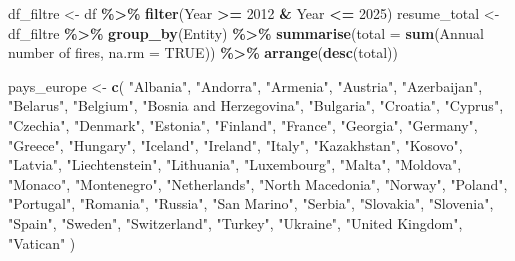 \documentclass[
]{article}
\newenvironment{Shaded}{\begin{snugshade}}{\end{snugshade}}
\newcommand{\AttributeTok}[1]{\textcolor[rgb]{0.13,0.29,0.53}{#1}}
\newcommand{\ConstantTok}[1]{\textcolor[rgb]{0.56,0.35,0.01}{#1}}
\newcommand{\DecValTok}[1]{\textcolor[rgb]{0.00,0.00,0.81}{#1}}
\newcommand{\FunctionTok}[1]{\textcolor[rgb]{0.13,0.29,0.53}{\textbf{#1}}}
\newcommand{\NormalTok}[1]{#1}
\newcommand{\OtherTok}[1]{\textcolor[rgb]{0.56,0.35,0.01}{#1}}
\newcommand{\SpecialCharTok}[1]{\textcolor[rgb]{0.81,0.36,0.00}{\textbf{#1}}}
\newcommand{\StringTok}[1]{\textcolor[rgb]{0.31,0.60,0.02}{#1}}
\begin{document}
\begin{Shaded}
\begin{Highlighting}[]
\NormalTok{df\_filtre }\OtherTok{\textless{}{-}}\NormalTok{ df }\SpecialCharTok{\%\textgreater{}\%} \FunctionTok{filter}\NormalTok{(Year }\SpecialCharTok{\textgreater{}=} \DecValTok{2012} \SpecialCharTok{\&}\NormalTok{ Year }\SpecialCharTok{\textless{}=} \DecValTok{2025}\NormalTok{)}
\NormalTok{resume\_total }\OtherTok{\textless{}{-}}\NormalTok{ df\_filtre }\SpecialCharTok{\%\textgreater{}\%}
  \FunctionTok{group\_by}\NormalTok{(Entity) }\SpecialCharTok{\%\textgreater{}\%}
  \FunctionTok{summarise}\NormalTok{(}\AttributeTok{total =} \FunctionTok{sum}\NormalTok{(}\StringTok{\textasciigrave{}}\AttributeTok{Annual number of fires}\StringTok{\textasciigrave{}}\NormalTok{, }\AttributeTok{na.rm =} \ConstantTok{TRUE}\NormalTok{)) }\SpecialCharTok{\%\textgreater{}\%}
  \FunctionTok{arrange}\NormalTok{(}\FunctionTok{desc}\NormalTok{(total))}

\NormalTok{pays\_europe }\OtherTok{\textless{}{-}} \FunctionTok{c}\NormalTok{(}
  \StringTok{"Albania"}\NormalTok{, }\StringTok{"Andorra"}\NormalTok{, }\StringTok{"Armenia"}\NormalTok{, }\StringTok{"Austria"}\NormalTok{, }\StringTok{"Azerbaijan"}\NormalTok{, }\StringTok{"Belarus"}\NormalTok{, }\StringTok{"Belgium"}\NormalTok{, }\StringTok{"Bosnia and Herzegovina"}\NormalTok{,}
  \StringTok{"Bulgaria"}\NormalTok{, }\StringTok{"Croatia"}\NormalTok{, }\StringTok{"Cyprus"}\NormalTok{, }\StringTok{"Czechia"}\NormalTok{, }\StringTok{"Denmark"}\NormalTok{, }\StringTok{"Estonia"}\NormalTok{, }\StringTok{"Finland"}\NormalTok{, }\StringTok{"France"}\NormalTok{, }\StringTok{"Georgia"}\NormalTok{,}
  \StringTok{"Germany"}\NormalTok{, }\StringTok{"Greece"}\NormalTok{, }\StringTok{"Hungary"}\NormalTok{, }\StringTok{"Iceland"}\NormalTok{, }\StringTok{"Ireland"}\NormalTok{, }\StringTok{"Italy"}\NormalTok{, }\StringTok{"Kazakhstan"}\NormalTok{, }\StringTok{"Kosovo"}\NormalTok{, }\StringTok{"Latvia"}\NormalTok{, }\StringTok{"Liechtenstein"}\NormalTok{,}
  \StringTok{"Lithuania"}\NormalTok{, }\StringTok{"Luxembourg"}\NormalTok{, }\StringTok{"Malta"}\NormalTok{, }\StringTok{"Moldova"}\NormalTok{, }\StringTok{"Monaco"}\NormalTok{, }\StringTok{"Montenegro"}\NormalTok{, }\StringTok{"Netherlands"}\NormalTok{, }\StringTok{"North Macedonia"}\NormalTok{,}
  \StringTok{"Norway"}\NormalTok{, }\StringTok{"Poland"}\NormalTok{, }\StringTok{"Portugal"}\NormalTok{, }\StringTok{"Romania"}\NormalTok{, }\StringTok{"Russia"}\NormalTok{, }\StringTok{"San Marino"}\NormalTok{, }\StringTok{"Serbia"}\NormalTok{, }\StringTok{"Slovakia"}\NormalTok{, }\StringTok{"Slovenia"}\NormalTok{, }\StringTok{"Spain"}\NormalTok{,}
  \StringTok{"Sweden"}\NormalTok{, }\StringTok{"Switzerland"}\NormalTok{, }\StringTok{"Turkey"}\NormalTok{, }\StringTok{"Ukraine"}\NormalTok{, }\StringTok{"United Kingdom"}\NormalTok{, }\StringTok{"Vatican"}
\NormalTok{)}


\end{Highlighting}
\end{Shaded}
\end{document}
